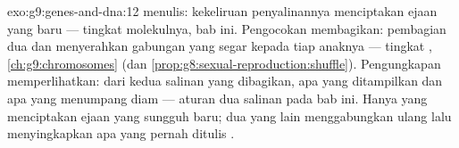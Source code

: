\begin{solution}{exo:g9:genes-and-dna:12}
 menulis: kekeliruan penyalinannya menciptakan ejaan
yang baru --- tingkat molekulnya, bab ini. Pengocokan
membagikan: pembagian dua dan  menyerahkan
gabungan yang segar kepada tiap anaknya --- tingkat
, \cref{ch:g9:chromosomes} (dan
\cref{prop:g8:sexual-reproduction:shuffle}). Pengungkapan
memperlihatkan: dari kedua salinan yang dibagikan, apa yang
ditampilkan dan apa yang menumpang diam --- aturan dua
salinan pada bab ini. Hanya  yang menciptakan ejaan
yang sungguh baru; dua yang lain menggabungkan ulang lalu
menyingkapkan apa yang pernah ditulis .
\end{solution}

